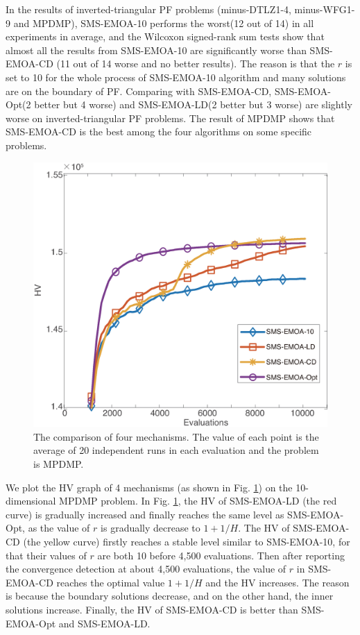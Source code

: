 \documentclass[conference]{IEEEtran}
\begin{document}
In the results of inverted-triangular PF problems (minus-DTLZ1-4, minus-WFG1-9 and MPDMP), 
SMS-EMOA-10 performs the worst(12 out of 14) in all experiments in average, 
and the Wilcoxon signed-rank sum tests show that almost all the results from SMS-EMOA-10 are significantly worse than SMS-EMOA-CD
(11 out of 14 worse and no better results). 
The reason is that the $r$ is set to 10 for the whole process of SMS-EMOA-10 algorithm and many solutions are on the boundary of PF.
Comparing with SMS-EMOA-CD, SMS-EMOA-Opt(2 better but 4 worse) and SMS-EMOA-LD(2 better but 3 worse) are slightly worse 
on inverted-triangular PF problems. 
The result of MPDMP shows that SMS-EMOA-CD is the best among the four algorithms on some specific problems. 

\begin{figure}[!t]
  \centering
    \includegraphics[width=\columnwidth]{SMSEMOA_MPDMP_hv_2}
  \caption{The comparison of four mechanisms. %
  The value of each point is the average of 20 independent runs in each evaluation
  and the problem is MPDMP. 
  }
  \label{crdmp}
\end{figure}
We plot the HV graph of 4 mechanisms (as shown in Fig. \ref{crdmp}) on the 10-dimensional MPDMP problem. 
In Fig. \ref{crdmp}, the HV of SMS-EMOA-LD (the red curve) is gradually increased 
and finally reaches the same level as SMS-EMOA-Opt, as the value of $r$ is gradually decrease to $1+1/H$.
The HV of SMS-EMOA-CD (the yellow curve) firstly reaches a stable level similar to SMS-EMOA-10, 
for that their values of $r$ are both 10 before 4,500 evaluations. 
Then after reporting the convergence detection at about 4,500 evaluations, 
the value of $r$ in SMS-EMOA-CD reaches the optimal value $1+1/H$ 
and the HV increases. 
The reason is because the boundary solutions decrease, and on the other hand, the inner solutions increase. 
Finally, the HV of SMS-EMOA-CD is better than SMS-EMOA-Opt and SMS-EMOA-LD. 
\end{document}
